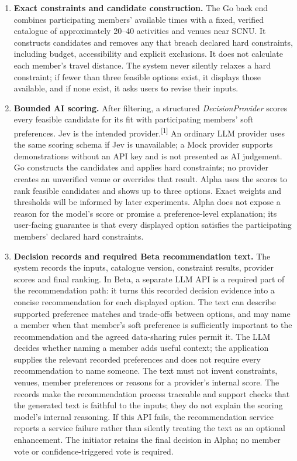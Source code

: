\documentclass[12pt,a4paper]{article}
\begin{document}
\begin{enumerate}
  \item \textbf{Exact constraints and candidate construction.} The Go back end combines participating members' available times with a fixed, verified catalogue of approximately 20--40 activities and venues near SCNU. It constructs candidates and removes any that breach declared hard constraints, including budget, accessibility and explicit exclusions. It does not calculate each member's travel distance. The system never silently relaxes a hard constraint; if fewer than three feasible options exist, it displays those available, and if none exist, it asks users to revise their inputs.
  \item \textbf{Bounded AI scoring.} After filtering, a structured \emph{DecisionProvider} scores every feasible candidate for its fit with participating members' soft preferences. Jev is the intended provider.\textsuperscript{[1]} An ordinary LLM provider uses the same scoring schema if Jev is unavailable; a Mock provider supports demonstrations without an API key and is not presented as AI judgement. Go constructs the candidates and applies hard constraints; no provider creates an unverified venue or overrides that result. Alpha uses the scores to rank feasible candidates and shows up to three options. Exact weights and thresholds will be informed by later experiments. Alpha does not expose a reason for the model's score or promise a preference-level explanation; its user-facing guarantee is that every displayed option satisfies the participating members' declared hard constraints.
  \item \textbf{Decision records and required Beta recommendation text.} The system records the inputs, catalogue version, constraint results, provider scores and final ranking. In Beta, a separate LLM API is a required part of the recommendation path: it turns this recorded decision evidence into a concise recommendation for each displayed option. The text can describe supported preference matches and trade-offs between options, and may name a member when that member's soft preference is sufficiently important to the recommendation and the agreed data-sharing rules permit it. The LLM decides whether naming a member adds useful context; the application supplies the relevant recorded preferences and does not require every recommendation to name someone. The text must not invent constraints, venues, member preferences or reasons for a provider's internal score. The records make the recommendation process traceable and support checks that the generated text is faithful to the inputs; they do not explain the scoring model's internal reasoning. If this API fails, the recommendation service reports a service failure rather than silently treating the text as an optional enhancement. The initiator retains the final decision in Alpha; no member vote or confidence-triggered vote is required.
\end{enumerate}
\end{document}
